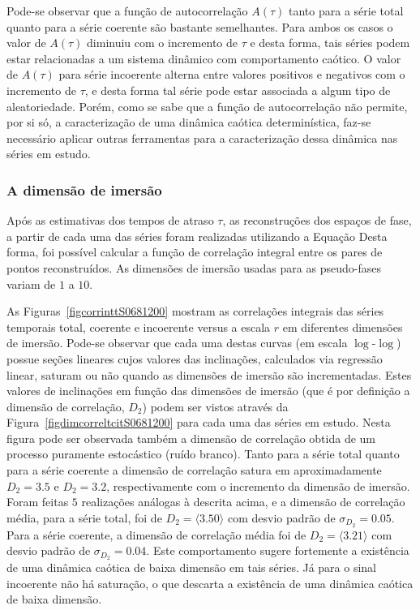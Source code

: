 Pode-se observar que a função de autocorrelação $A(\tau)$ tanto para a série total quanto para a série coerente são bastante semelhantes. Para ambos os casos o valor de $A(\tau)$ diminuiu com o incremento de $\tau$ e desta forma, tais séries podem estar relacionadas a um sistema dinâmico com comportamento caótico. O valor de $A(\tau)$ para série incoerente alterna entre valores positivos e negativos com o incremento de $\tau$, e desta forma tal série pode estar associada a algum tipo de aleatoriedade. Porém, como se sabe que a função de autocorrelação não permite, por si só, a caracterização de uma dinâmica caótica determinística, faz-se necessário aplicar outras ferramentas para a caracterização dessa dinâmica nas séries em estudo.

\subsubsection{A dimensão de imersão}

Após as estimativas dos tempos de atraso $\tau$, as reconstruções dos espaços de fase, a partir de cada uma das séries foram realizadas utilizando a Equação%
Desta forma, foi possível calcular a função de correlação integral%
entre os pares de pontos reconstruídos. As dimensões de imersão usadas para as pseudo-fases variam de $1$ a $10$. 

As Figuras~\ref{figcorrinttS0681200} mostram as correlações integrais das séries temporais total, coerente e incoerente versus a escala $r$ em diferentes dimensões de imersão. Pode-se observar que cada uma destas curvas (em escala $\log$-$\log$) possue seções lineares cujos valores das inclinações, calculados via regressão linear, saturam ou não quando as dimensões de imersão são incrementadas. Estes valores de inclinações em função das dimensões de imersão (que é por definição a dimensão de correlação, $D_{2}$) podem ser vistos através da Figura~\ref{figdimcorreltcitS0681200} para cada uma das séries em estudo. Nesta figura pode ser observada também a dimensão de correlação obtida de um processo puramente estocástico (ruído branco). Tanto para a série total quanto para a série coerente a dimensão de correlação satura em aproximadamente $D_{2}=3.5$ e $D_{2}=3.2$, respectivamente com o incremento da dimensão de imersão. Foram feitas $5$ realizações análogas à descrita acima, e a dimensão de correlação média, para a série total, foi de $D_{2}=\langle3.50\rangle$ com desvio padrão de $\sigma_{D_{2}}=0.05$. Para a série coerente, a dimensão de correlação média foi de $D_{2}=\langle3.21\rangle$ com desvio padrão de $\sigma_{D_{2}}=0.04$. Este comportamento sugere fortemente a existência de uma dinâmica caótica de baixa dimensão em tais séries. Já para o sinal incoerente não há saturação, o que descarta a existência de uma dinâmica caótica de baixa dimensão.



